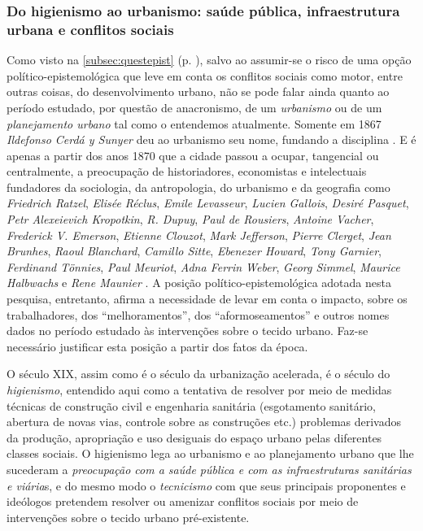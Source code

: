 \subsubsection{Do higienismo ao urbanismo: saúde pública, infraestrutura urbana e conflitos sociais}\label{subsubsec:higienurb}

Como visto na \autoref{subsec:questepist} (p. \pageref{subsec:questepist}), salvo ao assumir-se o risco de uma opção político-epistemológica que leve em conta os conflitos sociais como motor, entre outras coisas, do desenvolvimento urbano, não se pode falar ainda quanto ao período estudado, por questão de anacronismo, de um \textit{urbanismo} ou de um \textit{planejamento urbano} tal como o entendemos atualmente. Somente em 1867 \textit{Ildefonso Cerdá y Sunyer} deu ao urbanismo seu nome, fundando a disciplina \cite[pp.~47-51]{vasconcelos_dois_2012}. E é apenas a partir dos anos 1870 que a cidade passou a ocupar, tangencial ou centralmente, a preocupação de historiadores, economistas e intelectuais fundadores da sociologia, da antropologia, do urbanismo e da geografia como \textit{Friedrich Ratzel}, \textit{Elisée Réclus}, \textit{Emile Levasseur}, \textit{Lucien Gallois}, \textit{Desiré Pasquet}, \textit{Petr Alexeievich Kropotkin}, \textit{R. Dupuy}, \textit{Paul de Rousiers}, \textit{Antoine Vacher}, \textit{Frederick V. Emerson}, \textit{Etienne Clouzot}, \textit{Mark Jefferson}, \textit{Pierre Clerget}, \textit{Jean Brunhes}, \textit{Raoul Blanchard}, \textit{Camillo Sitte}, \textit{Ebenezer Howard}, \textit{Tony Garnier}, \textit{Ferdinand Tönnies}, \textit{Paul Meuriot}, \textit{Adna Ferrin Weber}, \textit{Georg Simmel}, \textit{Maurice Halbwachs} e \textit{Rene Maunier} \cite[pp.~53-102]{vasconcelos_dois_2012}. A posição político-epistemológica adotada nesta pesquisa, entretanto, afirma a necessidade de levar em conta o impacto, sobre os trabalhadores, dos ``melhoramentos'', dos ``aformoseamentos'' e outros nomes dados no período estudado às intervenções sobre o tecido urbano. Faz-se necessário justificar esta posição a partir dos fatos da época.

O século XIX, assim como é o século da urbanização acelerada, é o século do \textit{higienismo}, entendido aqui como a tentativa de resolver por meio de medidas técnicas de construção civil e engenharia sanitária (esgotamento sanitário, abertura de novas vias, controle sobre as construções etc.) problemas derivados da produção, apropriação e uso desiguais do espaço urbano pelas diferentes classes sociais. O higienismo lega ao urbanismo e ao planejamento urbano que lhe sucederam a \textit{preocupação com a saúde pública e com as infraestruturas sanitárias e viária}s, e do mesmo modo o \textit{tecnicismo} com que seus principais proponentes e ideólogos pretendem resolver ou amenizar conflitos sociais por meio de intervenções sobre o tecido urbano pré-existente.

